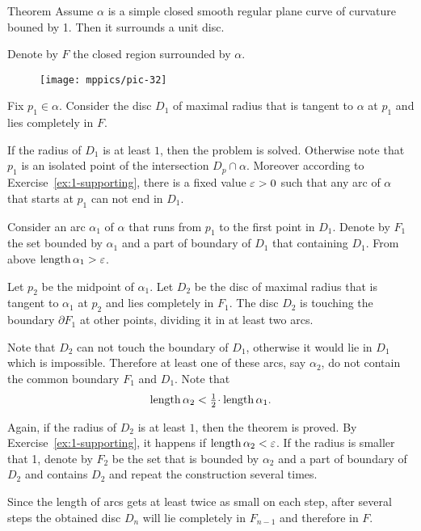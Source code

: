 \begin{thm}{Theorem}\label{thm:moon}
Assume $\alpha$ is a simple closed smooth regular plane curve of curvature bouned by 1.
Then it surrounds a unit disc.
\end{thm}

Denote by $F$ the closed region surrounded by $\alpha$. 

\begin{figure}%
\vskip-0mm
\centering
\texttt{[image: mppics/pic-32]}
\vskip0mm
\end{figure}

Fix $p_1\in \alpha$.
Consider the disc $D_1$ of maximal radius 
that is tangent to $\alpha$ at $p_1$ and lies completely in $F$.

If the radius of $D_1$ is at least $1$, then the problem is solved.
Otherwise note that $p_1$ is an isolated point of the intersection $D_p\cap \alpha$.
Moreover according to Exercise~\ref{ex:1-supporting}, there is a fixed value $\varepsilon>0$ such that any arc of $\alpha$
that starts at $p_1$ can not end in $D_1$.

Consider an arc $\alpha_1$ of $\alpha$ that runs from $p_1$ to the first point in $D_1$.
Denote by $F_1$ the set bounded by $\alpha_1$ and a part of boundary of $D_1$ that containing $D_1$.
From above $\mathop{\rm length}\nolimits \alpha_1>\varepsilon$.

Let $p_2$ be the midpoint of $\alpha_1$.
Let $D_2$ be the disc of maximal radius that is tangent to $\alpha_1$ at $p_2$ and lies completely in $F_1$. 
The disc $D_2$ is touching the boundary $\partial F_1$ at other points, dividing it in at least two arcs.

Note that $D_2$ can not touch the boundary of $D_1$, otherwise it would lie in $D_1$ which is impossible.
Therefore at least one of these arcs, say $\alpha_2$, do not contain the common boundary $F_1$ and $D_1$.
Note that 
\[\length \alpha_2< \tfrac12\cdot\length\alpha_1.\]

Again, if the radius of $D_2$ is at least $1$, then the theorem is proved.
By Exercise~\ref{ex:1-supporting}, it happens if $\mathop{\rm length}\nolimits \alpha_2<\varepsilon$.
If the radius is smaller that 1, denote by $F_2$ be the set that is bounded by $\alpha_2$ and a part of boundary of $D_2$ and contains $D_2$ and repeat the construction several times. 

Since the length of arcs gets at least twice as small on each step, 
after several steps the obtained disc $D_n$ will lie completely in $F_{n-1}$ and therefore in $F$. 
\qeds

